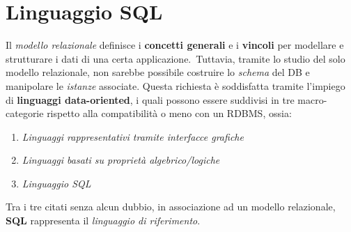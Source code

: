 \documentclass{article}
\begin{document}
\pagestyle{empty}

\section*{Linguaggio SQL} 
\large
Il \textit{modello relazionale} definisce i \textbf{concetti generali} e i \textbf{vincoli} per modellare e strutturare i dati di una certa applicazione.\ Tuttavia, tramite lo studio del solo modello relazionale, non sarebbe possibile costruire lo \textit{schema} del DB e manipolare le \textit{istanze} associate.
Questa richiesta è soddisfatta tramite l'impiego di \textbf{linguaggi data-oriented}, i quali possono essere suddivisi in tre macro-categorie rispetto alla compatibilità o meno con un RDBMS, ossia:
\begin{enumerate}
    \renewcommand{\labelenumi}{-} 
    \itemsep0em
    \item \textit{Linguaggi rappresentativi tramite interfacce grafiche}
    \item \textit{Linguaggi basati su proprietà algebrico/logiche}
    \item \textit{Linguaggio SQL}
\end{enumerate}
Tra i tre citati senza alcun dubbio, in associazione ad un modello relazionale, \textbf{SQL} rappresenta il \textit{linguaggio di riferimento}.
\end{document}
